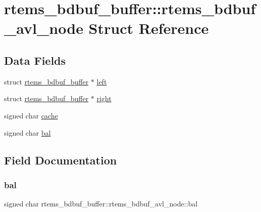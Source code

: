 \hypertarget{structrtems__bdbuf__buffer_1_1rtems__bdbuf__avl__node}{}\section{rtems\+\_\+bdbuf\+\_\+buffer\+::rtems\+\_\+bdbuf\+\_\+avl\+\_\+node Struct Reference}
\label{structrtems__bdbuf__buffer_1_1rtems__bdbuf__avl__node}
\subsection*{Data Fields}
\begin{DoxyCompactItemize}
\item 
struct \mbox{\hyperlink{structrtems__bdbuf__buffer}{rtems\+\_\+bdbuf\+\_\+buffer}} $\ast$ \mbox{\hyperlink{structrtems__bdbuf__buffer_1_1rtems__bdbuf__avl__node_af180def7eb9bbbf7b03c034d2ac89677}{left}}
\item 
struct \mbox{\hyperlink{structrtems__bdbuf__buffer}{rtems\+\_\+bdbuf\+\_\+buffer}} $\ast$ \mbox{\hyperlink{structrtems__bdbuf__buffer_1_1rtems__bdbuf__avl__node_a1d8ba652c90b6a012932febee8c1f2c8}{right}}
\item 
signed char \mbox{\hyperlink{structrtems__bdbuf__buffer_1_1rtems__bdbuf__avl__node_a10c27eed26c2ad39d1620a327e41cab0}{cache}}
\item 
signed char \mbox{\hyperlink{structrtems__bdbuf__buffer_1_1rtems__bdbuf__avl__node_a17c63de07ea09bfe480a1ecd197680ea}{bal}}
\end{DoxyCompactItemize}


\subsection{Field Documentation}
\mbox{\label{structrtems__bdbuf__buffer_1_1rtems__bdbuf__avl__node_a17c63de07ea09bfe480a1ecd197680ea}} 
\subsubsection{\texorpdfstring{bal}{bal}}
{\footnotesize\ttfamily signed char rtems\+\_\+bdbuf\+\_\+buffer\+::rtems\+\_\+bdbuf\+\_\+avl\+\_\+node\+::bal}

